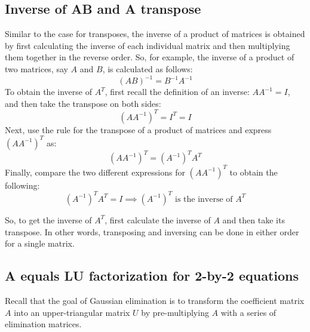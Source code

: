 \documentclass[../main.tex]{subfiles}
\begin{document}
\subsection{Inverse of AB and A transpose}
Similar to the case for transposes, the inverse of a product of matrices is obtained by first calculating the inverse of each individual matrix and then multiplying them together in the reverse order. So, for example, the inverse of a product of two matrices, say \(A\) and \(B\), is calculated as follows:
\[
    (AB)^{-1} = B^{-1}A^{-1}
\]
To obtain the inverse of \(A^{T}\), first recall the definition of an inverse: \(AA^{-1} = I\), and then take the transpose on both sides:
\[
    (AA^{-1})^{T} = I^{T} = I
\]
Next, use the rule for the transpose of a product of matrices and express \((AA^{-1})^{T}\) as:
\[
    (AA^{-1})^{T} = (A^{-1})^{T}A^{T}
\]
Finally, compare the two different expressions for \((AA^{-1})^{T}\) to obtain the following:
\[
    (A^{-1})^{T}A^{T} = I \implies \text{\((A^{-1})^{T}\) is the inverse of \(A^{T}\)}
\]
\vspace{0.5em}

So, to get the inverse of \(A^{T}\), first calculate the inverse of \(A\) and then take its transpose. In other words, transposing and inversing can be done in either order for a single matrix.


\subsection{A equals LU factorization for 2-by-2 equations}
Recall that the  goal of Gaussian elimination is to transform the coefficient matrix \(A\) into an upper-triangular matrix \(U\) by pre-multiplying \(A\) with a series of elimination matrices.
\vspace{0.5em}
\end{document}
